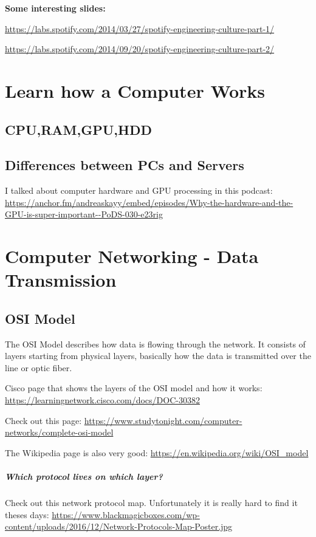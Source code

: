 \documentclass[12pt, numbers=noenddot]{scrreprt} %
\begin{document}
\textbf{Some interesting slides:}

\url{https://labs.spotify.com/2014/03/27/spotify-engineering-culture-part-1/}

\url{https://labs.spotify.com/2014/09/20/spotify-engineering-culture-part-2/}


 \chapter{Learn how a Computer Works}

\section{CPU,RAM,GPU,HDD}

\section{Differences between PCs and Servers}

I talked about computer hardware and GPU processing in this podcast: \url{https://anchor.fm/andreaskayy/embed/episodes/Why-the-hardware-and-the-GPU-is-super-important--PoDS-030-e23rig}

\chapter{Computer Networking - Data Transmission}

\section{OSI Model}

The OSI Model describes how data is flowing through the network. It consists of layers starting from physical layers, basically how the data is transmitted over the line or optic fiber. 

Cisco page that shows the layers of the OSI model and how it works: \url{https://learningnetwork.cisco.com/docs/DOC-30382}
 
Check out this page: \url{https://www.studytonight.com/computer-networks/complete-osi-model}

The Wikipedia page is also very good: \url{https://en.wikipedia.org/wiki/OSI_model}

\paragraph{Which protocol lives on which layer?} Check out this network protocol map. Unfortunately it is really hard to find it theses days:
\url{https://www.blackmagicboxes.com/wp-content/uploads/2016/12/Network-Protocols-Map-Poster.jpg}
\end{document}
